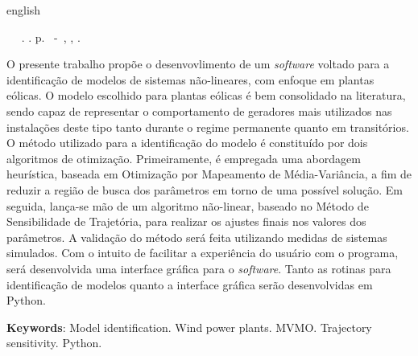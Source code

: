 \begin{resumo}[Abstract]
 \begin{otherlanguage*}{english}
	\begin{flushleft} 
		\setlength{\absparsep}{0pt} %
 		\SingleSpacing 
 		\imprimirautorabr~ ~\textbf{\imprimirtitleabstract}.	\imprimirdata.  \pageref{LastPage}p. 
		\imprimirtipotrabalho~-~\imprimirinstituicao, \imprimirlocal, 	\imprimirdata. 
 	\end{flushleft}
\OnehalfSpacing
O presente trabalho prop\~oe o desenvovlimento de um \textit{software} voltado para a identifica\c{c}\~ao de modelos de sistemas n\~ao-lineares, com enfoque em plantas e\'olicas. O modelo escolhido para plantas e\'olicas \'e bem consolidado na literatura, sendo capaz de representar o comportamento de geradores mais utilizados nas instala\c{c}\~oes deste tipo tanto durante o regime permanente quanto em transit\'orios. O m\'etodo utilizado para a identifica\c{c}\~ao do modelo \'e constitu\'ido por dois algoritmos de otimiza\c{c}\~ao. Primeiramente, \'e empregada uma abordagem heur\'istica, baseada em Otimiza\c{c}\~ao por Mapeamento de M\'edia-Vari\^ancia, a fim de reduzir a regi\~ao de busca dos par\^ametros em torno de uma poss\'ivel solu\c{c}\~ao. Em seguida, lan\c{c}a-se m\~ao de um algoritmo n\~ao-linear, baseado no M\'etodo de Sensibilidade de Trajet\'oria, para realizar os ajustes finais nos valores dos par\^ametros. A valida\c{c}\~ao do m\'etodo ser\'a feita utilizando medidas de sistemas simulados. Com o intuito de facilitar a experi\^encia do usu\'ario com o programa, ser\'a desenvolvida uma interface gr\'afica para o \textit{software}. Tanto as rotinas para identifica\c{c}\~ao de modelos quanto a interface gr\'afica ser\~ao desenvolvidas em Python.


\textbf{Keywords}: Model identification. Wind power plants. MVMO. Trajectory sensitivity. Python.
 \end{otherlanguage*}
\end{resumo}
